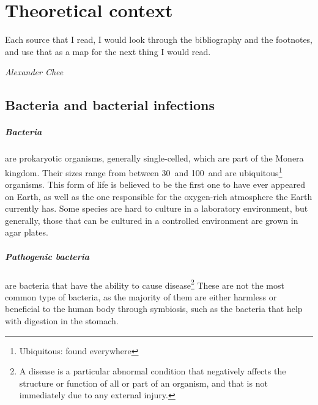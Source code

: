 \chapter{Theoretical context}
\epigraph{Each source that I read, I would look through the bibliography and the footnotes, and use that as a map for the next thing I would read.}{\textit{Alexander Chee}}
\section{Bacteria and bacterial infections}
\paragraph{Bacteria} are prokaryotic organisms, generally single-celled, which are part of the Monera kingdom. Their sizes range from between 30\textmu\ and 100\textmu\ and are ubiquitous\footnote{Ubiquitous: found everywhere} organisms. This form of life is believed to be the first one to have ever appeared on Earth, as well as the one responsible for the oxygen-rich atmosphere the Earth currently has. Some species are hard to culture in a laboratory environment, but generally, those that can be cultured in a controlled environment are grown in agar plates\cite{murrayMicrobiologiaMedica2013}. \newline
\paragraph{Pathogenic bacteria} are bacteria that have the ability to cause disease\footnote{A disease is a particular abnormal condition that negatively affects the structure or function of all or part of an organism, and that is not immediately due to any external injury\cite{DorlandsMedicalDictionary2010}.} These are not the most common type of bacteria, as the majority of them are either harmless or beneficial to the human body through symbiosis, such as the bacteria that help with digestion in the stomach\cite{murrayMicrobiologiaMedica2013}.
